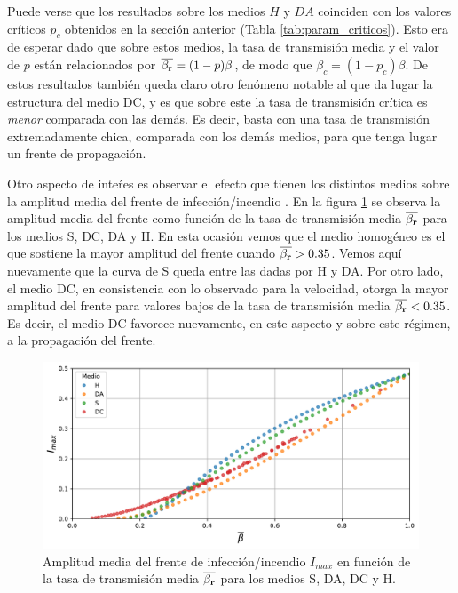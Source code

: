 Puede verse que los resultados sobre los medios $H$ y $DA$ coinciden con los valores críticos $p_c$ obtenidos en la sección anterior (Tabla \ref{tab:param_criticos}).
Esto era de esperar dado que sobre estos medios, la tasa de transmisión media y el valor de $p$ están relacionados por $\overline{\beta_{\vb r}}=(1-p)\beta$, de modo que 
$\beta_c=(1-p_c)\beta$. De estos resultados también queda claro otro fenómeno notable al que da lugar la estructura del medio DC, y es que sobre este la tasa 
de transmisión crítica es \textit{menor} comparada con las demás. Es decir, basta con una tasa de transmisión extremadamente chica, comparada con los demás medios,
para que tenga lugar un frente de propagación.

Otro aspecto de inteŕes es observar el efecto que tienen los distintos medios sobre la amplitud media del frente de infección/incendio . En la figura \ref{fig:I_all} se 
observa la amplitud media del frente como función de la tasa de transmisión media $\overline{\beta_{\vb r}}$ para los medios S, DC, DA y H. En esta ocasión vemos que el
medio homogéneo es el que sostiene la mayor amplitud del frente cuando $\overline{\beta_{\vb r}}>0.35$. Vemos aquí nuevamente que la curva de S queda entre las dadas 
por H y DA. Por otro lado, el medio DC, en consistencia con lo observado para la velocidad, otorga la mayor amplitud del frente para valores bajos de la tasa de
transmisión media $\overline{\beta_{\vb r}}<0.35$. Es decir, el medio DC favorece nuevamente, en este aspecto y sobre este régimen, a la propagación del frente.

\begin{figure}[h]
    \centering
    \includegraphics[width=\imsizeL]{I_all.pdf}
    \caption{Amplitud media del frente de infección/incendio $I_{max}$ en función de la tasa de transmisión media $\overline{\beta_{\vb r}}$ para los medios S, DA, 
    DC y H.}
    \label{fig:I_all}
\end{figure}

